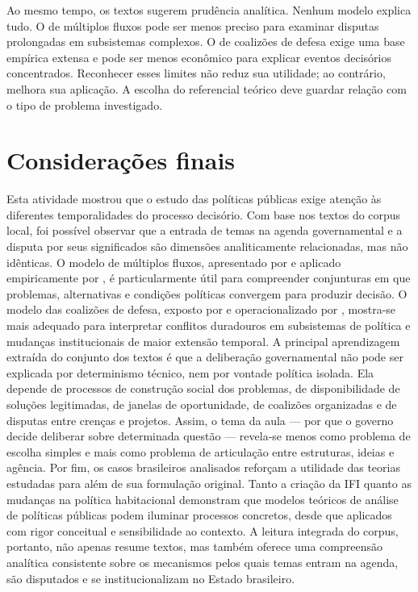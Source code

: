 \documentclass[12pt,a4paper]{article}
\begin{document}
Ao mesmo tempo, os textos sugerem prudência analítica. Nenhum modelo explica tudo. O de múltiplos fluxos pode ser menos preciso para examinar disputas prolongadas em subsistemas complexos. O de coalizões de defesa exige uma base empírica extensa e pode ser menos econômico para explicar eventos decisórios concentrados. Reconhecer esses limites não reduz sua utilidade; ao contrário, melhora sua aplicação. A escolha do referencial teórico deve guardar relação com o tipo de problema investigado.
\section{Considerações finais}
\label{sec:orgffd60a8}
Esta atividade mostrou que o estudo das políticas públicas exige atenção às diferentes temporalidades do processo decisório. Com base nos textos do corpus local, foi possível observar que a entrada de temas na agenda governamental e a disputa por seus significados são dimensões analiticamente relacionadas, mas não idênticas. O modelo de múltiplos fluxos, apresentado por \textcite{capella2022multiplos} e aplicado empiricamente por \textcite{bijos2024ifi}, é particularmente útil para compreender conjunturas em que problemas, alternativas e condições políticas convergem para produzir decisão. O modelo das coalizões de defesa, exposto por \textcite{araujoSilva2022coalizoes} e operacionalizado por \textcite{ferreira2019habitacional}, mostra-se mais adequado para interpretar conflitos duradouros em subsistemas de política e mudanças institucionais de maior extensão temporal.
A principal aprendizagem extraída do conjunto dos textos é que a deliberação governamental não pode ser explicada por determinismo técnico, nem por vontade política isolada. Ela depende de processos de construção social dos problemas, de disponibilidade de soluções legitimadas, de janelas de oportunidade, de coalizões organizadas e de disputas entre crenças e projetos. Assim, o tema da aula — por que o governo decide deliberar sobre determinada questão — revela-se menos como problema de escolha simples e mais como problema de articulação entre estruturas, ideias e agência.
Por fim, os casos brasileiros analisados reforçam a utilidade das teorias estudadas para além de sua formulação original. Tanto a criação da IFI quanto as mudanças na política habitacional demonstram que modelos teóricos de análise de políticas públicas podem iluminar processos concretos, desde que aplicados com rigor conceitual e sensibilidade ao contexto. A leitura integrada do corpus, portanto, não apenas resume textos, mas também oferece uma compreensão analítica consistente sobre os mecanismos pelos quais temas entram na agenda, são disputados e se institucionalizam no Estado brasileiro.

\printbibliography
\end{document}
